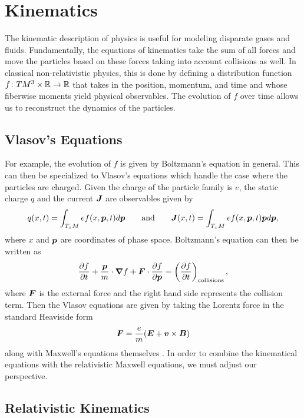 \documentclass{article}
\begin{document}
\section{Kinematics}

The kinematic description of physics is useful for modeling disparate gases and fluids. Fundamentally, the equations of kinematics take the sum of all forces and move the particles based on these forces taking into account collisions as well. In classical non-relativistic physics, this is done by defining a distribution function $f\colon TM^3 \times \mathbb{R} \to \mathbb{R}$ that takes in the position, momentum, and time and whose fiberwise moments yield physical observables. The evolution of $f$ over time allows us to reconstruct the dynamics of the particles.

\subsection{Vlasov's Equations}
For example, the evolution of $f$ is given by Boltzmann's equation in general. This can then be specialized to Vlasov's equations which handle the case where the particles are charged. Given the charge of the particle family is $e$, the static charge $q$ and the current $\boldsymbol{J}$ are observables given by
\begin{equation}
    q(x,t) = \int_{T_xM} e f(x,\boldsymbol{p},t)d\boldsymbol{p} \qquad \textrm{and} \qquad  \boldsymbol{J}(x,t) =  \int_{T_xM} ef(x,\boldsymbol{p},t)\boldsymbol{p}d\boldsymbol{p},
\end{equation}
where $x$ and $\boldsymbol{p}$ are coordinates of phase space. Boltzmann's equation can then be written as
\begin{equation}
\frac{\partial f}{\partial t} + \frac{\boldsymbol{p}}{m} \cdot \boldsymbol{\nabla} f + \boldsymbol{F} \cdot \frac{\partial f}{\partial \boldsymbol{p}} = \left( \frac{\partial f}{\partial t}\right)_{\textrm{collisions}},
\end{equation}
where $\boldsymbol{F}$ is the external force and the right hand side represents the collision term. Then the Vlasov equations are given by taking the Lorentz force in the standard Heaviside form 
\begin{equation}
\boldsymbol{F} = \frac{e}{m}(\boldsymbol{E}+\boldsymbol{v}\times \boldsymbol{B})
\end{equation}
along with Maxwell's equations themselves \cite{manning_analysis_2009}. In order to combine the kinematical equations with the relativistic Maxwell equations, we must adjust our perspective.

\subsection{Relativistic Kinematics}
\end{document}
